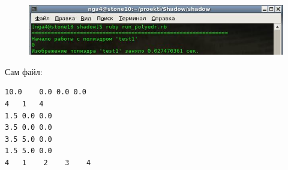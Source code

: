 \begin{figure}[ht!]
\begin{center}
\includegraphics[scale=0.7]{images/6.jpg}
\end{center}
\end{figure}

Сам файл:

\begin{small}
\begin{verbatim}
10.0	0.0	0.0	0.0
4	1	4
1.5 0.0 0.0
3.5 0.0 0.0
3.5 5.0 0.0
1.5 5.0 0.0
4	1    2    3    4    
\end{verbatim}
\end{small}







